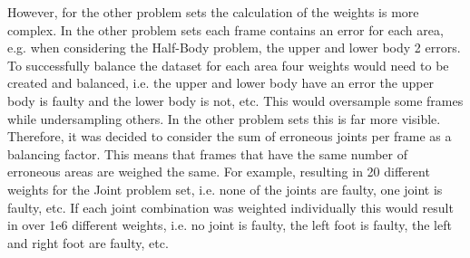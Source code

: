 However, for the other problem sets the calculation of the weights is more complex. In the other problem sets each frame contains an error for each area, e.g. when considering the Half-Body problem, the upper and lower body 2 errors. To successfully balance the dataset for each area four weights would need to be created and balanced, i.e. the upper and lower body have an error the upper body is faulty and the lower body is not, etc. This would oversample some frames while undersampling others. In the other problem sets this is far more visible. Therefore, it was decided to consider the sum of erroneous joints per frame as a balancing factor. This means that frames that have the same number of erroneous areas are weighed the same. For example, resulting in 20 different weights for the Joint problem set, i.e. none of the joints are faulty, one joint is faulty, etc. If each joint combination was weighted individually this would result in over 1e6 different weights, i.e. no joint is faulty, the left foot is faulty, the left and right foot are faulty, etc.
